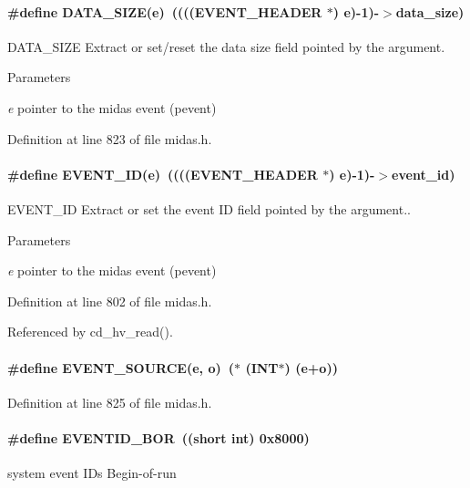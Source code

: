 \paragraph[{DATA\_\-SIZE}]{\setlength{\rightskip}{0pt plus 5cm}\#define DATA\_\-SIZE(e)~(((({\bf EVENT\_\-HEADER} $\ast$) e)-\/1)-\/$>$data\_\-size)}\hfill\label{group__mbufferh_ga5327bc310729f5ec36b917ed13e6ff66}
DATA\_\-SIZE Extract or set/reset the data size field pointed by the argument. 
\begin{DoxyParams}{Parameters}
\item[{\em e}]pointer to the midas event (pevent) \end{DoxyParams}


Definition at line 823 of file midas.h.
\paragraph[{EVENT\_\-ID}]{\setlength{\rightskip}{0pt plus 5cm}\#define EVENT\_\-ID(e)~(((({\bf EVENT\_\-HEADER} $\ast$) e)-\/1)-\/$>$event\_\-id)}\hfill\label{group__mbufferh_gaf42c9a1ac33cf459bfd366673f6a4d70}
EVENT\_\-ID Extract or set the event ID field pointed by the argument.. 
\begin{DoxyParams}{Parameters}
\item[{\em e}]pointer to the midas event (pevent) \end{DoxyParams}


Definition at line 802 of file midas.h.

Referenced by cd\_\-hv\_\-read().
\paragraph[{EVENT\_\-SOURCE}]{\setlength{\rightskip}{0pt plus 5cm}\#define EVENT\_\-SOURCE(e, \/  o)~($\ast$ ({\bf INT}$\ast$) (e+o))}\hfill\label{group__mbufferh_gaeb8c16d5c488c75a83c59bee146461ad}


Definition at line 825 of file midas.h.
\paragraph[{EVENTID\_\-BOR}]{\setlength{\rightskip}{0pt plus 5cm}\#define EVENTID\_\-BOR~((short int) 0x8000)}\hfill\label{group__mbufferh_gaea58a47233f988dd2f9a0320d99734dc}
system event IDs Begin-\/of-\/run 

